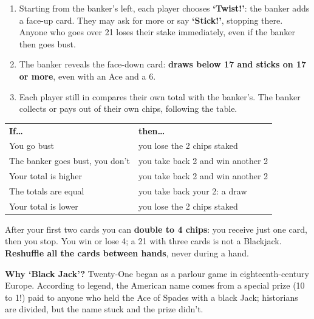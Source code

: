 \documentclass[10pt]{article}
\begin{document}
\startpage
{}
\begin{enumerate}[resume]
 \item Starting from the banker’s left, each player chooses \textbf{‘Twist!’}: the banker adds a face-up card. They may ask for more or say \textbf{‘Stick!’}, stopping there. Anyone who goes over 21 loses their stake immediately, even if the banker then goes bust.
 \item The banker reveals the face-down card: \textbf{draws below 17 and sticks on 17 or more}, even with an Ace and a 6.
 \item Each player still in compares their own total with the banker’s. The banker collects or pays out of their own chips, following the table.
\end{enumerate}
\begin{center}\small\setlength{\tabcolsep}{2mm}\renewcommand{\arraystretch}{1.35}
\begin{tabular}{@{}m{50mm}m{62mm}@{}}
\rowcolor{tint}\textbf{If…} & \textbf{then…}\\
You go bust & you lose the 2 chips staked\\
The banker goes bust, you don’t & you take back 2 and win another 2\\
Your total is higher & you take back 2 and win another 2\\
The totals are equal & you take back your 2: a draw\\
Your total is lower & you lose the 2 chips staked\\
\end{tabular}
\end{center}
\begin{center}
\hfill
{}
\end{center}
After your first two cards you can \textbf{double to 4 chips}: you receive just one card, then you stop. You win or lose 4; a 21 with three cards is not a Blackjack. \textbf{Reshuffle all the cards between hands}, never during a hand.
\begin{callout}
	\textbf{Why ‘Black Jack’?} Twenty-One began as a parlour game in eighteenth-century Europe. According to legend, the American name comes from a special prize (10 to 1!) paid to anyone who held the Ace of Spades with a black Jack; historians are divided, but the name stuck and the prize didn’t.
\end{callout}
\vfill
{}
\end{document}
